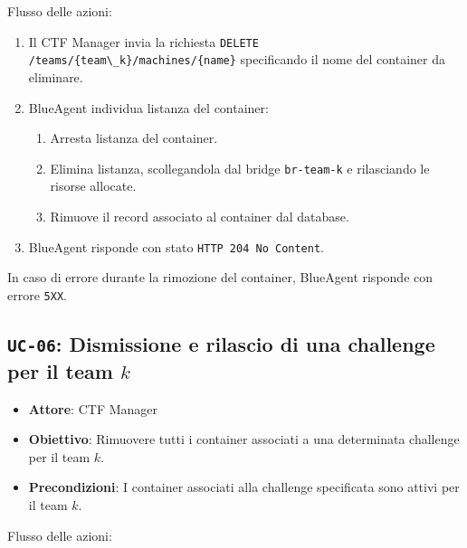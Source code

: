 Flusso delle azioni:

\begin{enumerate}
\def\labelenumi{\arabic{enumi}.}
\tightlist
\item
  Il CTF Manager invia la richiesta
  \passthrough{\lstinline!DELETE /teams/\{team\_k\}/machines/\{name\}!}
  specificando il nome del container da eliminare.
\item
  BlueAgent individua l\textquotesingle istanza del container:

  \begin{enumerate}
  \def\labelenumii{\arabic{enumii}.}
  \tightlist
  \item
    Arresta l\textquotesingle istanza del container.
  \item
    Elimina l\textquotesingle istanza, scollegandola dal bridge
    \passthrough{\lstinline!br-team-k!} e rilasciando le risorse
    allocate.
  \item
    Rimuove il record associato al container dal database.
  \end{enumerate}
\item
  BlueAgent risponde con stato
  \passthrough{\lstinline!HTTP 204 No Content!}.
\end{enumerate}

In caso di errore durante la rimozione del container, BlueAgent risponde
con errore \passthrough{\lstinline!5XX!}.

\subsection{\texorpdfstring{\texttt{UC-06}: Dismissione e rilascio di
una challenge per il team
\(k\)}{UC-06: Dismissione e rilascio di una challenge per il team k}}\label{uc-06-dismissione-e-rilascio-di-una-challenge-per-il-team-k}

\begin{itemize}
\tightlist
\item
  \textbf{Attore}: CTF Manager
\item
  \textbf{Obiettivo}: Rimuovere tutti i container associati a una
  determinata challenge per il team \(k\).
\item
  \textbf{Precondizioni}: I container associati alla challenge
  specificata sono attivi per il team \(k\).
\end{itemize}

Flusso delle azioni:

